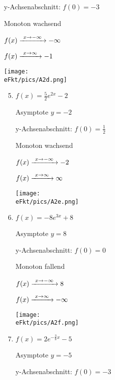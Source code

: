 \begin{Answer}[ref=eFktA2]
\begin{minipage}{\textwidth}
\begin{minipage}{0.5\textwidth}
\begin{enumerate}[label=\alph*)]
				y-Achsenabschnitt: \(f(0)=-3\)

				Monoton wachsend

				\(f(x)\xrightarrow{\hphantom{\ }x\to-\infty\hphantom{\ }}-\infty\)

				\(f(x)\xrightarrow{\hphantom{\ }x\to\infty\hphantom{\ }}-1\)

				\texttt{[image: \\eFkt/pics/A2d.png]}
			\end{enumerate}
		\end{minipage}%
	\end{minipage}
	\newpage
	\begin{minipage}{\textwidth}
		\begin{minipage}{0.5\textwidth}
			\begin{enumerate}[label=\alph*)]
				\setcounter{enumi}{4}
				\item \(f(x)=\frac{5}{2}e^{2x}-2\)

				Asymptote \(y=-2\)

				y-Achsenabschnitt: \(f(0)=\frac{1}{2}\)

				Monoton wachsend

				\(f(x)\xrightarrow{\hphantom{\ }x\to-\infty\hphantom{\ }}-2\)

				\(f(x)\xrightarrow{\hphantom{\ }x\to\infty\hphantom{\ }}\infty\)

				\texttt{[image: \\eFkt/pics/A2e.png]}
				\item \(f(x)=-8e^{3x}+8\)

				Asymptote \(y=8\)

				y-Achsenabschnitt: \(f(0)=0\)

				Monoton fallend

				\(f(x)\xrightarrow{\hphantom{\ }x\to-\infty\hphantom{\ }}8\)

				\(f(x)\xrightarrow{\hphantom{\ }x\to\infty\hphantom{\ }}-\infty\)

				\texttt{[image: \\eFkt/pics/A2f.png]}
			\end{enumerate}
		\end{minipage}%
		\begin{minipage}{0.5\textwidth}
			\begin{enumerate}[label=\alph*)]
				\setcounter{enumi}{6}
				\item \(f(x)=2e^{-\frac{3}{8}x}-5\)

				Asymptote \(y=-5\)

				y-Achsenabschnitt: \(f(0)=-3\)


\end{enumerate}
\end{minipage}
\end{minipage}
\end{Answer}

